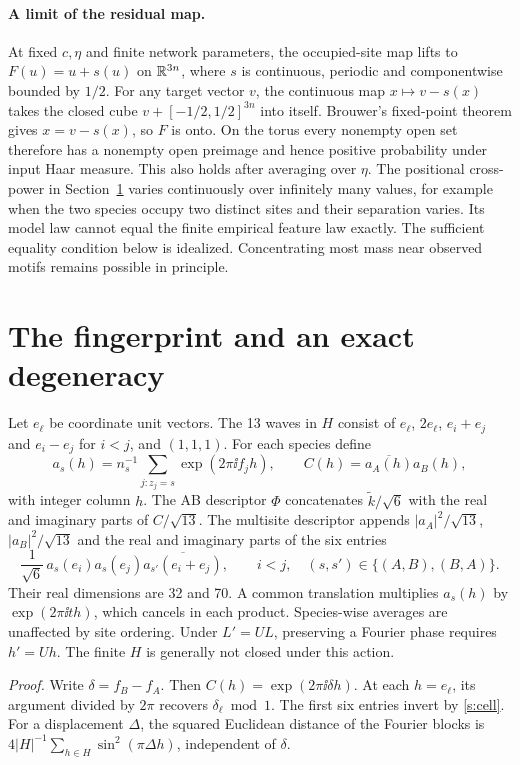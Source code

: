 \paragraph{A limit of the residual map.}
At fixed $c,\eta$ and finite network parameters, the occupied-site map lifts to $F(u)=u+s(u)$ on $\mathbb R^{3n}$, where $s$ is continuous, periodic and componentwise bounded by $1/2$. For any target vector $v$, the continuous map $x\mapsto v-s(x)$ takes the closed cube $v+[-1/2,1/2]^{3n}$ into itself. Brouwer's fixed-point theorem gives $x=v-s(x)$, so $F$ is onto. On the torus every nonempty open set therefore has a nonempty open preimage and hence positive probability under input Haar measure. This also holds after averaging over $\eta$. The positional cross-power in Section~\ref{s:fingerprint} varies continuously over infinitely many values, for example when the two species occupy two distinct sites and their separation varies. Its model law cannot equal the finite empirical feature law exactly. The sufficient equality condition below is idealized. Concentrating most mass near observed motifs remains possible in principle.

\newpage
\section{The fingerprint and an exact degeneracy}\label{s:fingerprint}
Let $e_\ell$ be coordinate unit vectors. The 13 waves in $H$ consist of $e_\ell$, $2e_\ell$, $e_i+e_j$ and $e_i-e_j$ for $i<j$, and $(1,1,1)$. For each species define
\[
 a_s(h)=n_s^{-1}\sum_{j:z_j=s}\exp(2\pi\ii f_jh),\qquad
 C(h)=\overline{a_A(h)}a_B(h),
\]
with integer column $h$. The AB descriptor $\Phi$ concatenates $\tilde k/\sqrt6$ with the real and imaginary parts of $C/\sqrt{13}$. The multisite descriptor appends $|a_A|^2/\sqrt{13}$, $|a_B|^2/\sqrt{13}$ and the real and imaginary parts of the six entries
\begin{equation}
 \frac{1}{\sqrt6}\,a_s(e_i)a_s(e_j)\overline{a_{s'}(e_i+e_j)},
 \qquad i<j,\quad (s,s')\in\{(A,B),(B,A)\}.
 \label{s:triples}
\end{equation}
Their real dimensions are 32 and 70. A common translation multiplies $a_s(h)$ by $\exp(2\pi\ii th)$, which cancels in each product. Species-wise averages are unaffected by site ordering. Under $L'=UL$, preserving a Fourier phase requires $h'=Uh$. The finite $H$ is generally not closed under this action.

\noindent\emph{Proof.}
Write $\delta=f_B-f_A$. Then $C(h)=\exp(2\pi\ii\delta h)$. At each $h=e_\ell$, its argument divided by $2\pi$ recovers $\delta_\ell\bmod1$. The first six entries invert by \eqref{s:cell}. For a displacement $\Delta$, the squared Euclidean distance of the Fourier blocks is $4|H|^{-1}\sum_{h\in H}\sin^2(\pi\Delta h)$, independent of $\delta$. \proofend

